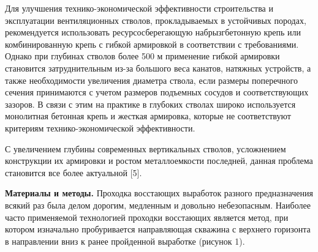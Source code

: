 \begin{multicols}{2}
Для улучшения технико-экономической эффективности строительства и
эксплуатации вентиляционных стволов, прокладываемых в устойчивых
породах, рекомендуется использовать ресурсосберегающую набрызгбетонную
крепь или комбинированную крепь с гибкой армировкой в соответствии с
требованиями. Однако при глубинах стволов более 500 м применение гибкой
армировки становится затруднительным из-за большого веса канатов,
натяжных устройств, а также необходимости увеличения диаметра ствола,
если размеры поперечного сечения принимаются с учетом размеров подъемных
сосудов и соответствующих зазоров. В связи с этим на практике в глубоких
стволах широко используется монолитная бетонная крепь и жесткая
армировка, которые не соответствуют критериям технико-экономической
эффективности.

С увеличением глубины современных вертикальных стволов, усложнением
конструкции их армировки и ростом металлоемкости последней, данная
проблема становится все более актуальной {[}5{]}.

{\bfseries Материалы и методы.} Проходка восстающих выработок разного
предназначения всякий раз была делом дорогим, медленным и довольно
небезопасным. Наиболее часто применяемой технологией проходки восстающих
является метод, при котором изначально пробуривается направляющая
скважина с верхнего горизонта в направлении вниз к ранее пройденной
выработке (рисунок 1).
\end{multicols}

